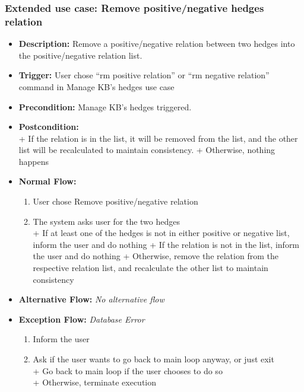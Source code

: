 \documentclass[../gr-final.tex]{subfiles}
\begin{document}
\subsubsection{Extended use case: Remove positive/negative hedges relation}
\begin{itemize}
  \item {\bfseries Description:} Remove a positive/negative relation
    between two hedges into the
    positive/negative relation list. 
  \item {\bfseries Trigger:} User chose ``rm positive relation'' or
    ``rm negative relation'' command in
    Manage KB's hedges use case
  \item {\bfseries Precondition:} Manage KB's hedges triggered.
  \item {\bfseries Postcondition:}\\
    \indent + If the relation is in the list, it will be removed from the list, and the other
    list will be recalculated to maintain consistency.    
    \indent + Otherwise, nothing happens
  \item {\bfseries Normal Flow:}
    \begin{enumerate}
      \item User chose Remove positive/negative relation 
      \item The system asks user for the two hedges\\
        \indent + If at least one of the hedges is not in either
        positive or negative list, inform the
        user and do nothing
        \indent + If the relation is not in the list, inform the
        user and do nothing
        \indent + Otherwise, remove the relation from the respective
        relation list, and recalculate the other list to maintain
        consistency
    \end{enumerate}
  \item {\bfseries Alternative Flow:} {\em No alternative flow}
  \item {\bfseries Exception Flow:}
    {\em Database Error}
    \begin{enumerate}
      \item Inform the user
      \item Ask if the user wants to go back to main loop anyway,
        or just exit\\
        \indent + Go back to main loop if the user chooses to do
        so\\
        \indent + Otherwise, terminate execution
    \end{enumerate}
\end{itemize}
\end{document}
